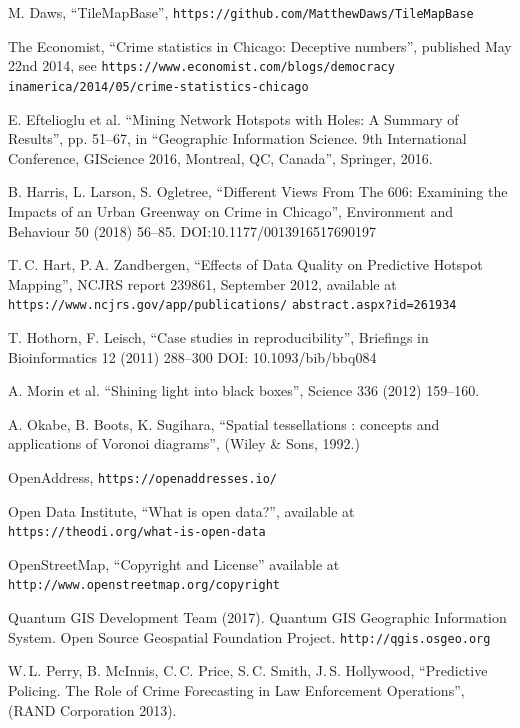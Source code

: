 \documentclass[twoside,a4paper,twocolumn,10pt]{article}
\theoremstyle{plain}
\theoremstyle{definition}
\begin{document}
\begin{thebibliography}{99}
 M. Daws, ``TileMapBase'',
   {\small\texttt{https://github.com/MatthewDaws/TileMapBase}}

 The Economist, ``Crime statistics in Chicago: Deceptive numbers'', published
  May 22nd 2014, see
  {\small\texttt{https://www.economist.com/blogs/democracy}
   \texttt{inamerica/2014/05/crime-statistics-chicago}}

 E. Eftelioglu et al. ``Mining Network Hotspots with Holes: A Summary of Results'',
  pp. 51--67, in ``Geographic Information Science.  9th International Conference, GIScience 2016, Montreal, QC, Canada'',
  Springer, 2016.

 B. Harris, L. Larson, S. Ogletree,
  ``Different Views From The 606: Examining the Impacts of an Urban Greenway on Crime in Chicago'',
  Environment and Behaviour 50 (2018) 56--85.  DOI:10.1177/0013916517690197

 T.\,C. Hart, P.\,A. Zandbergen,
  ``Effects of Data Quality on Predictive Hotspot Mapping'',
  NCJRS report 239861, September 2012, available at
  {\small
  \texttt{https://www.ncjrs.gov/app/publications/}
   \texttt{abstract.aspx?id=261934}}

 T. Hothorn, F. Leisch, ``Case studies in reproducibility'',
  Briefings in Bioinformatics 12 (2011) 288--300 DOI: 10.1093/bib/bbq084

 A. Morin et al. ``Shining light into black boxes'',
  Science 336 (2012) 159--160.

 A. Okabe, B. Boots, K. Sugihara,
  ``Spatial tessellations : concepts and applications of Voronoi diagrams'',
  (Wiley \& Sons, 1992.)

 OpenAddress, {\small\texttt{https://openaddresses.io/}}

 Open Data Institute, ``What is open data?'', available at
   {\small\texttt{https://theodi.org/what-is-open-data}}

 OpenStreetMap, ``Copyright and License'' available at
   {\small\texttt{http://www.openstreetmap.org/copyright}}

 Quantum GIS Development Team (2017).
  Quantum GIS Geographic Information System. Open Source Geospatial Foundation Project.
  {\small\texttt{http://qgis.osgeo.org}}

 W.\,L. Perry, B. McInnis, C.\,C. Price, S.\,C. Smith, J.\,S. Hollywood,
        ``Predictive Policing. The Role of Crime Forecasting in Law Enforcement Operations'',
        (RAND Corporation 2013).


\end{thebibliography}
\end{document}
